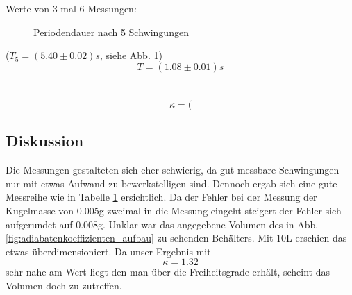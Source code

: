 \documentclass[12pt,a4paper]{article}
\begin{document}
\begin{multicols}{2}
Werte von 3 mal 6 Messungen:
\begin{figure}[H]
	\centering
	\caption{Periodendauer nach 5 Schwingungen}
	\label{fig:adiabaten_periode_messung}
\end{figure}
\noindent
($T_5 = (5.40 \pm 0.02)s$, siehe Abb. \ref{fig:adiabaten_periode_messung})
$$T=(1.08 \pm 0.01)s$$\\
\\
$$\kappa = ($$

\subsection{Diskussion}
Die Messungen gestalteten sich eher schwierig, da gut messbare Schwingungen nur mit etwas Aufwand zu bewerkstelligen sind. Dennoch ergab sich eine gute Messreihe wie in Tabelle \ref{fig:adiabaten_periode_messung} ersichtlich.
Da der Fehler bei der Messung der Kugelmasse von 0.005g zweimal in die Messung eingeht steigert der Fehler sich aufgerundet auf 0.008g. Unklar war das angegebene Volumen des in Abb. \ref{fig:adiabatenkoeffizienten_aufbau} zu sehenden Behälters. Mit 10L erschien das etwas überdimensioniert. Da unser Ergebnis mit $$\kappa = 1.32$$ sehr nahe am Wert liegt den man über die Freiheitsgrade erhält, scheint das Volumen doch zu zutreffen.



\end{multicols}
\end{document}

